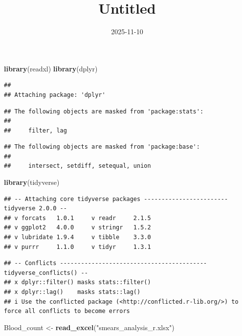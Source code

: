 \documentclass[
]{article}
\title{Untitled}
\author{}
\date{\vspace{-2.5em}2025-11-10}
\newenvironment{Shaded}{\begin{snugshade}}{\end{snugshade}}
\newcommand{\FunctionTok}[1]{\textcolor[rgb]{0.13,0.29,0.53}{\textbf{#1}}}
\newcommand{\NormalTok}[1]{#1}
\newcommand{\OtherTok}[1]{\textcolor[rgb]{0.56,0.35,0.01}{#1}}
\newcommand{\StringTok}[1]{\textcolor[rgb]{0.31,0.60,0.02}{#1}}
\begin{document}
\maketitle

\begin{Shaded}
\begin{Highlighting}[]
 \FunctionTok{library}\NormalTok{(readxl)}
\FunctionTok{library}\NormalTok{(dplyr)}
\end{Highlighting}
\end{Shaded}

\begin{verbatim}
## 
## Attaching package: 'dplyr'
\end{verbatim}

\begin{verbatim}
## The following objects are masked from 'package:stats':
## 
##     filter, lag
\end{verbatim}

\begin{verbatim}
## The following objects are masked from 'package:base':
## 
##     intersect, setdiff, setequal, union
\end{verbatim}

\begin{Shaded}
\begin{Highlighting}[]
\FunctionTok{library}\NormalTok{(tidyverse)}
\end{Highlighting}
\end{Shaded}

\begin{verbatim}
## -- Attaching core tidyverse packages ------------------------ tidyverse 2.0.0 --
## v forcats   1.0.1     v readr     2.1.5
## v ggplot2   4.0.0     v stringr   1.5.2
## v lubridate 1.9.4     v tibble    3.3.0
## v purrr     1.1.0     v tidyr     1.3.1
\end{verbatim}

\begin{verbatim}
## -- Conflicts ------------------------------------------ tidyverse_conflicts() --
## x dplyr::filter() masks stats::filter()
## x dplyr::lag()    masks stats::lag()
## i Use the conflicted package (<http://conflicted.r-lib.org/>) to force all conflicts to become errors
\end{verbatim}

\begin{Shaded}
\begin{Highlighting}[]
\NormalTok{Blood\_count }\OtherTok{\textless{}{-}} \FunctionTok{read\_excel}\NormalTok{(}\StringTok{"smears\_analysis\_r.xlsx"}\NormalTok{)}
\end{Highlighting}
\end{Shaded}
\end{document}
